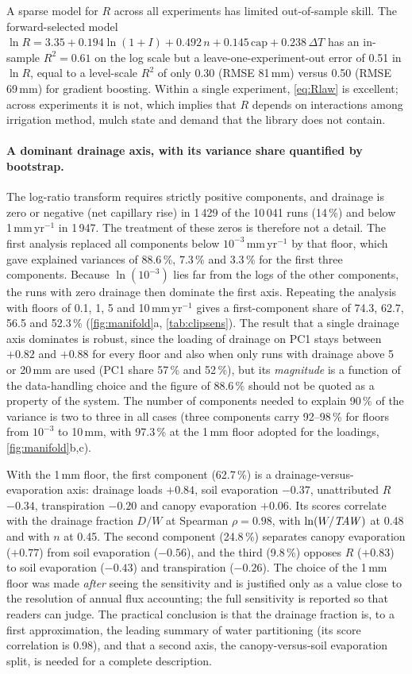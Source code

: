 A sparse model for $R$ across all experiments has limited out-of-sample skill. The forward-selected model $\ln R=3.35+0.194\ln(1+I)+0.492\,n+0.145\,\mathrm{cap}+0.238\,\Delta T$ has an in-sample $R^2=0.61$ on the log scale but a leave-one-experiment-out error of 0.51 in $\ln R$, equal to a level-scale $R^2$ of only 0.30 (RMSE 81\,mm) versus 0.50 (RMSE 69\,mm) for gradient boosting. Within a single experiment, \cref{eq:Rlaw} is excellent; across experiments it is not, which implies that $R$ depends on interactions among irrigation method, mulch state and demand that the library does not contain.

\paragraph{A dominant drainage axis, with its variance share quantified by bootstrap.}
The log-ratio transform requires strictly positive components, and drainage is zero or negative (net capillary rise) in 1\,429 of the 10\,041 runs (14\,\%) and below 1\,mm\,yr$^{-1}$ in 1\,947. The treatment of these zeros is therefore not a detail. The first analysis replaced all components below $10^{-3}$\,mm\,yr$^{-1}$ by that floor, which gave explained variances of 88.6\,\%, 7.3\,\% and 3.3\,\% for the first three components. Because $\ln(10^{-3})$ lies far from the logs of the other components, the runs with zero drainage then dominate the first axis. Repeating the analysis with floors of 0.1, 1, 5 and 10\,mm\,yr$^{-1}$ gives a first-component share of 74.3, 62.7, 56.5 and 52.3\,\% (\cref{fig:manifold}a, \cref{tab:clipsens}). The result that a single drainage axis dominates is robust, since the loading of drainage on PC1 stays between $+0.82$ and $+0.88$ for every floor and also when only runs with drainage above 5 or 20\,mm are used (PC1 share 57\,\% and 52\,\%), but its \emph{magnitude} is a function of the data-handling choice and the figure of 88.6\,\% should not be quoted as a property of the system. The number of components needed to explain 90\,\% of the variance is two to three in all cases (three components carry 92--98\,\% for floors from $10^{-3}$ to 10\,mm, with 97.3\,\% at the 1\,mm floor adopted for the loadings, \cref{fig:manifold}b,c).

With the 1\,mm floor, the first component (62.7\,\%) is a drainage-versus-evaporation axis: drainage loads $+0.84$, soil evaporation $-0.37$, unattributed $R$ $-0.34$, transpiration $-0.20$ and canopy evaporation $+0.06$. Its scores correlate with the drainage fraction $D/W$ at Spearman $\rho=0.98$, with $\ln(W/\mathit{TAW})$ at 0.48 and with $n$ at 0.45. The second component (24.8\,\%) separates canopy evaporation ($+0.77$) from soil evaporation ($-0.56$), and the third (9.8\,\%) opposes $R$ ($+0.83$) to soil evaporation ($-0.43$) and transpiration ($-0.26$). The choice of the 1\,mm floor was made \emph{after} seeing the sensitivity and is justified only as a value close to the resolution of annual flux accounting; the full sensitivity is reported so that readers can judge. The practical conclusion is that the drainage fraction is, to a first approximation, the leading summary of water partitioning (its score correlation is 0.98), and that a second axis, the canopy-versus-soil evaporation split, is needed for a complete description.

